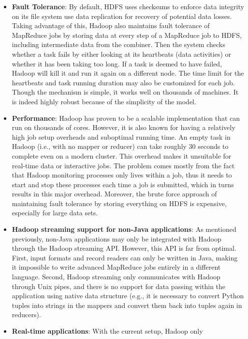 \documentclass[]{krantz}
\begin{document}
\begin{itemize}
\item
  \textbf{Fault Tolerance}: By default, HDFS uses checksums to enforce
  data integrity on its file system use data replication for recovery of
  potential data losses. Taking advantage of this, Hadoop also maintains
  fault tolerance of MapReduce jobs by storing data at every step of a
  MapReduce job to HDFS, including intermediate data from the combiner.
  Then the system checks whether a task fails by either looking at its
  heartbeats (data activities) or whether it has been taking too long.
  If a task is deemed to have failed, Hadoop will kill it and run it
  again on a different node. The time limit for the heartbeats and task
  running duration may also be customized for each job. Though the
  mechanism is simple, it works well on thousands of machines. It is
  indeed highly robust because of the simplicity of the model.
\item
  \textbf{Performance}: Hadoop has proven to be a scalable
  implementation that can run on thousands of cores. However, it is also
  known for having a relatively high job setup overheads and suboptimal
  running time. An empty task in Hadoop (i.e., with no mapper or
  reducer) can take roughly 30 seconds to complete even on a modern
  cluster. This overhead makes it unsuitable for real-time data or
  interactive jobs. The problem comes mostly from the fact that Hadoop
  monitoring processes only lives within a job, thus it needs to start
  and stop these processes each time a job is submitted, which in turns
  results in this major overhead. Moreover, the brute force approach of
  maintaining fault tolerance by storing everything on HDFS is
  expensive, especially for large data sets.
\item
  \textbf{Hadoop streaming support for non-Java applications}: As
  mentioned previously, non-Java applications may only be integrated
  with Hadoop through the Hadoop streaming API. However, this API is far
  from optimal. First, input formats and record readers can only be
  written in Java, making it impossible to write advanced MapReduce jobs
  entirely in a different language. Second, Hadoop streaming only
  communicates with Hadoop through Unix pipes, and there is no support
  for data passing within the application using native data structure
  (e.g., it is necessary to convert Python tuples into strings in the
  mappers and convert them back into tuples again in reducers).
\item
  \textbf{Real-time applications}: With the current setup, Hadoop only

\end{itemize}
\end{document}
